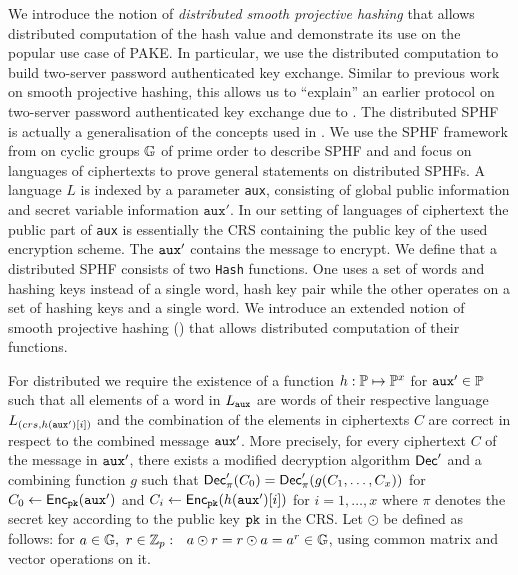 We introduce the notion of \emph{distributed smooth projective hashing} that allows distributed computation of the hash value and demonstrate its use on the popular use case of \acl{PAKE}.
In particular, we use the distributed computation to build two-server password authenticated key exchange.
Similar to previous work on smooth projective hashing, this allows us to ``explain'' an earlier protocol on two-server password authenticated key exchange due to \citeauthor{Katz2012a} \cite{Katz2012a}.
The distributed \ac{SPHF} is actually a generalisation of the concepts used in \cite{Katz2012a}.
We use the \ac{SPHF} framework from \cite{Benhamouda2013} on cyclic groups $\mathbb{G}$ of prime order to describe \ac{SPHF} and \SPHFF and focus on languages of ciphertexts to prove general statements on distributed \acp{SPHF}.
A language $L$ is indexed by a parameter \texttt{aux}, consisting of global public information and secret variable information $\mathtt{aux}'$.
In our setting of languages of ciphertext the public part of \texttt{aux} is essentially the \ac{CRS} containing the public key of the used encryption scheme.
The $\mathtt{aux}'$ contains the message to encrypt.
We define that a distributed \ac{SPHF} consists of two \texttt{Hash} functions.
One uses a set of words and hashing keys instead of a single word, hash key pair while the other operates on a set of hashing keys and a single word.
We introduce an extended notion of smooth projective hashing (\SPHFF) that allows distributed computation of their functions.

For distributed \SPHFF we require the existence of a function $h:\mathbb{P}\mapsto\mathbb{P}^x$ for $\mathtt{aux}'\in\mathbb{P}$ such that all elements of a word in $L_\mathtt{aux}$ are words of their respective language $L_{(crs,h(\mathtt{aux}')[i])}$ and the combination of the elements in ciphertexts $C$ are correct in respect to the combined message $\mathtt{aux}'$.
More precisely, for every ciphertext $C$ of the message in $\mathtt{aux}'$, there exists a modified decryption algorithm $\mathsf{Dec}'$ and a combining function $g$ such that $\mathsf{Dec}'_{\pi}(C_0)=\mathsf{Dec}'_{\pi}(g(C_1,\dots,C_x))$ for $C_0\gets\mathsf{Enc}_{\mathtt{pk}}(\mathtt{aux}')$ and $C_i\gets\mathsf{Enc}_{\mathtt{pk}}(h(\mathtt{aux}')[i])$ for $i=1,\dots,x$ where $\pi$ denotes the secret key according to the public key $\mathtt{pk}$ in the \ac{CRS}.
Let $\odot$ be defined as follows: for $a\in \mathbb{G},~ r\in\mathbb{Z}_p:$~ $a\odot r = r\odot a = a^r\in \mathbb{G}$, using common matrix and vector operations on it. 

